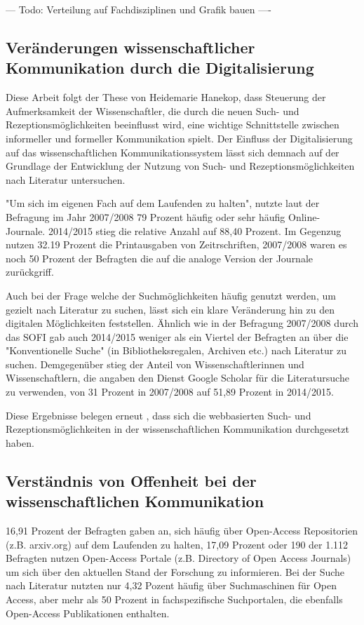--- Todo: Verteilung auf Fachdisziplinen und Grafik bauen ----

\subsection{Veränderungen wissenschaftlicher Kommunikation durch die Digitalisierung}

Diese Arbeit folgt der These von Heidemarie Hanekop, dass Steuerung der Aufmerksamkeit der Wissenschaftler, die durch die neuen Such- und Rezeptionsmöglichkeiten beeinflusst wird, eine wichtige Schnittstelle zwischen informeller und formeller Kommunikation spielt\cite{Hanekop_2014}. Der Einfluss der Digitalisierung auf das wissenschaftlichen Kommunikationssystem lässt sich demnach auf der Grundlage der Entwicklung der Nutzung von Such- und Rezeptionsmöglichkeiten nach Literatur untersuchen. 

"Um sich im eigenen Fach auf dem Laufenden zu halten", nutzte laut der Befragung im Jahr 2007/2008 79 Prozent häufig oder sehr häufig Online-Journale. 2014/2015 stieg die relative Anzahl auf 88,40 Prozent. Im Gegenzug nutzen 32.19 Prozent die Printausgaben von Zeitrschriften, 2007/2008 waren es noch 50 Prozent der Befragten die auf die analoge Version der Journale zurückgriff.

Auch bei der Frage welche der Suchmöglichkeiten häufig genutzt werden, um gezielt nach Literatur zu suchen, lässt sich ein klare Veränderung hin zu den digitalen Möglichkeiten feststellen. Ähnlich wie in der Befragung 2007/2008 durch das SOFI gab auch 2014/2015 weniger als ein Viertel der Befragten an über die "Konventionelle Suche" (in Bibliotheksregalen, Archiven etc.) nach Literatur zu suchen. Demgegenüber stieg der Anteil von Wissenschaftlerinnen und Wissenschaftlern, die angaben den Dienst Google Scholar für die Literatursuche zu verwenden, von 31 Prozent in 2007/2008 auf 51,89 Prozent in 2014/2015.

Diese Ergebnisse belegen erneut \cite{Hanekop_2014}, dass sich die webbasierten Such- und Rezeptionsmöglichkeiten in der wissenschaftlichen Kommunikation durchgesetzt haben.

\subsection{Verständnis von Offenheit bei der wissenschaftlichen Kommunikation}

16,91 Prozent der Befragten gaben an, sich häufig über Open-Access Repositorien (z.B. arxiv.org) auf dem Laufenden zu halten, 17,09 Prozent oder 190 der 1.112 Befragten nutzen Open-Access Portale (z.B. Directory of Open Access Journals) um sich über den aktuellen Stand der Forschung zu informieren. Bei der Suche nach Literatur nutzten nur 4,32 Pozent häufig über Suchmaschinen für Open Access, aber mehr als 50 Prozent in fachspezifische Suchportalen, die ebenfalls Open-Access Publikationen enthalten. 


